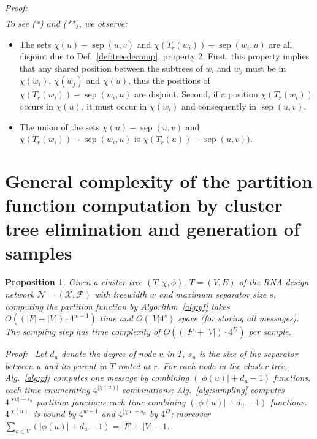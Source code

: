 \documentclass{bioinfo}
\newtheorem{proposition}[theorem]{Proposition}
\renewenvironment{proof}[1][]{\noindent \em Proof\ifthenelse{\equal{#1}{}}{}{ (#1)}:~}{}
\newcommand{\network}{\mathcal{N}}
\newcommand{\separator}[2]{\operatorname{sep}(#1,#2)}
\newcommand{\F}{\mathcal{F}}
\newcommand{\X}{\mathcal{X}}
\begin{document}
\begin{proof}
\begin{align*}
\end{align*}
To see (*) and (**), we observe:
\begin{itemize}
\item The sets $\chi(u)-\separator{u}{v}$ and
  $\chi(T_r(w_i))-\separator{w_i}{u}$ are all disjoint due to
  Def.~\ref{def:treedecomp}, property 2. First, this property implies
  that any shared position between the subtrees of $w_i$ and $w_j$
  must be in $\chi(w_i)$, $\chi(w_j)$ and $\chi(u)$, thus the
  positions of $\chi(T_r(w_i))-\separator{w_i}{u}$ are
  disjoint. Second, if a position $\chi(T_r(w_i))$ occurs in
  $\chi(u)$, it must occur in $\chi(w_i)$ and consequently in $\separator{u}{v}$.
\item The union of the sets $\chi(u)-\separator{u}{v}$ and
  $\chi(T_r(w_i))-\separator{w_i}{u}$ is $\chi(T_r(u))-\separator{u}{v}).$
\end{itemize}

\end{proof}

\section{General complexity of the partition function computation by cluster tree elimination and generation of samples}
\label{appsec:algcomplexity}

\begin{proposition}
  \label{prop:general-complexity}
Given a cluster tree $(T,\chi,\phi)$, $T=(V,E)$ of the RNA design network $\network=(\X,\F)$ with treewidth $w$ and maximum separator size $s$, computing the partition function by Algorithm~\ref{alg:pf} takes $O((|F|+|V|)\cdot 4^{w+1})$ time and $O(|V| 4^s)$ space (for storing all messages). The sampling step has time complexity of $O((|F|+|V|)\cdot 4^D)$ per sample.
\end{proposition}

\begin{proof}[Proposition~\ref{prop:general-complexity}]
Let $d_u$ denote the degree of node $u$ in $T$, $s_u$ is the size of the separator between
$u$ and its parent in $T$ rooted at $r$. For each node in the cluster tree, Alg.~\ref{alg:pf} computes one message by combining $(|\phi(u)|+d_u-1)$ functions, each time enumerating $4^{|\chi(u)|}$ combinations; Alg.~\ref{alg:sampling} computes $4^{|\chi{u}|-s_u}$ partition functions each time combining $(|\phi(u)|+d_u-1)$ functions.  $4^{|\chi(u)|}$ is bound by $4^{w+1}$ and $4^{|\chi{u}|-s_u}$ by $4^D$; moreover $\sum_{u\in V} (|\phi(u)|+d_u-1) = |F|+|V|-1$.
\end{proof}
\end{document}
